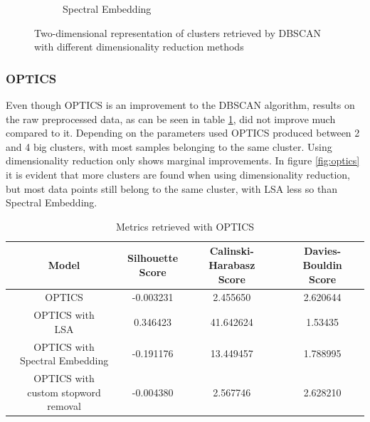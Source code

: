 \begin{figure}
\begin{subfigure}{.3\textwidth}
    \caption{Spectral Embedding}
    \label{fig:dbscan_spectral}
  \end{subfigure}
  \caption{Two-dimensional representation of clusters retrieved by DBSCAN with different dimensionality reduction methods}
  \label{fig:dbscan}
\end{figure}

\subsubsection{OPTICS}

Even though OPTICS is an improvement to the DBSCAN algorithm, results on the raw preprocessed data, as can be seen in table \ref{tab:scores_optics}, did not improve much compared to it. Depending on the parameters used OPTICS produced between 2 and 4 big clusters, with most samples belonging to the same cluster. Using dimensionality reduction only shows marginal improvements. In figure \ref{fig:optics} it is evident that more clusters are found when using dimensionality reduction, but most data points still belong to the same cluster, with LSA less so than Spectral Embedding.

\begin{table}[]
  \centering
  \begin{tabular}{c|c|c|c}
    Model &  \shortstack[c]{Silhouette \\ Score} & \shortstack[c]{Calinski-Harabasz \\ Score} &  \shortstack[c]{Davies-Bouldin \\ Score}  \\
    \hline
    \hline
    OPTICS & -0.003231 & 2.455650 & 2.620644 \\
    \hline
    \shortstack[c]{OPTICS with \\ LSA} & 0.346423 & 41.642624 & 1.53435 \\
    \hline
    \shortstack[c]{OPTICS with \\ Spectral Embedding} & -0.191176 & 13.449457 & 1.788995 \\
    \hline
    \shortstack[c]{OPTICS with \\ custom stopword removal} & -0.004380 & 2.567746 & 2.628210 \\
   \end{tabular}
  \caption{Metrics retrieved with OPTICS}
  \label{tab:scores_optics}
\end{table}

